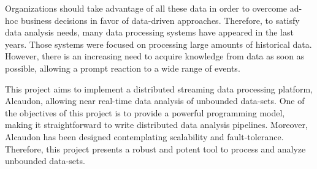 Organizations should take advantage of all these data in order to overcome
ad-hoc business decisions in favor of data-driven approaches. Therefore, to
satisfy data analysis needs, many data processing systems have appeared in
the last years. Those systems were focused on processing large amounts of
historical data. However, there is an increasing need to acquire knowledge
from data as soon as possible, allowing a prompt reaction to a wide range of
events.

This project aims to implement a distributed streaming data processing platform,
Alcaudon, allowing near real-time data analysis of unbounded data-sets. One of
the objectives of this project is to provide a powerful programming model,
making it straightforward to write distributed data analysis pipelines.
Moreover, Alcaudon has been designed contemplating scalability and
fault-tolerance. Therefore, this project presents a robust and potent tool to
process and analyze unbounded data-sets.
